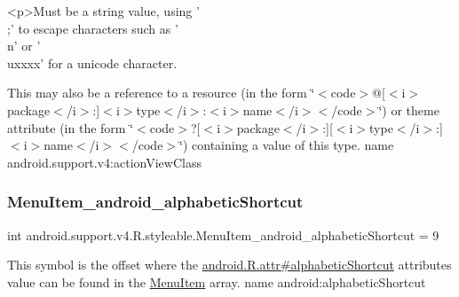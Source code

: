\begin{DoxyVerb}      <p>Must be a string value, using '\\;' to escape characters such as '\\n' or '\\uxxxx' for a unicode character.
\end{DoxyVerb}
 

This may also be a reference to a resource (in the form \char`\"{}$<$code$>$@\mbox{[}$<$i$>$package$<$/i$>$\+:\mbox{]}$<$i$>$type$<$/i$>$\+:$<$i$>$name$<$/i$>$$<$/code$>$\char`\"{}) or theme attribute (in the form \char`\"{}$<$code$>$?\mbox{[}$<$i$>$package$<$/i$>$\+:\mbox{]}\mbox{[}$<$i$>$type$<$/i$>$\+:\mbox{]}$<$i$>$name$<$/i$>$$<$/code$>$\char`\"{}) containing a value of this type.  name android.\+support.\+v4\+:action\+View\+Class \mbox{\label{classandroid_1_1support_1_1v4_1_1R_1_1styleable_a3cf2935e744fb9f942bad0c47703e631}} 
\subsubsection{\texorpdfstring{Menu\+Item\+\_\+android\+\_\+alphabetic\+Shortcut}{MenuItem\_android\_alphabeticShortcut}}
{\footnotesize\ttfamily int android.\+support.\+v4.\+R.\+styleable.\+Menu\+Item\+\_\+android\+\_\+alphabetic\+Shortcut = 9\hspace{0.3cm}{\ttfamily [static]}}

This symbol is the offset where the \hyperlink{}{android.\+R.\+attr\#alphabetic\+Shortcut} attribute\textquotesingle{}s value can be found in the \hyperlink{classandroid_1_1support_1_1v4_1_1R_1_1styleable_a4234e016636b99c0c3d9cfc512903697}{Menu\+Item} array.  name android\+:alphabetic\+Shortcut \mbox{\label{classandroid_1_1support_1_1v4_1_1R_1_1styleable_ae164f5c1d244ba85f9dd11fcbd4c1852}} 
